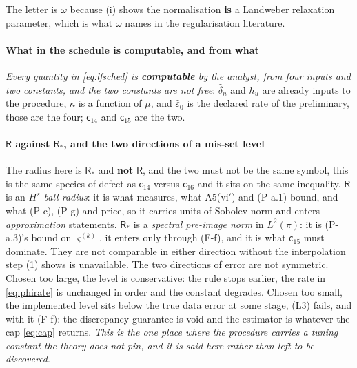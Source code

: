 The letter is $\omega$ because (i) shows the normalisation \textbf{is} a
Landweber relaxation parameter, which is what $\omega$ names in the regularisation literature.

\paragraph{What in the schedule is computable, and from what}

\emph{Every quantity in \eqref{eq:lfsched} is \textbf{computable} by the analyst, from four inputs and
two constants, and the two constants are not free}: $\hat\delta_n$ and $h_u$ are already inputs to the
procedure, $\kappa$ is a function of $\mu$, and $\hat\varepsilon_0$ is the declared rate of the
preliminary, those are the four; $\mathsf c_{14}$ and $\mathsf c_{15}$ are the two.

\paragraph{$\mathsf R$ against $\mathsf R_\ast$, and the two directions of a mis-set level}

The radius here is $\mathsf R_\ast$ and \textbf{not} $\mathsf R$, and the two must not be the same
symbol, this is the same species of defect as $\mathsf c_{14}$ versus $\mathsf c_{16}$ and it sits on
the same inequality. $\mathsf R$ is an \emph{$H^{s}$ ball radius}: it is what 
measures, what A5(vi$'$) and (P-a.1) bound, and what (P-c), (P-g) and  price, so it
carries units of Sobolev norm and enters \emph{approximation} statements. $\mathsf R_\ast$ is a
\emph{spectral pre-image norm} in $L^{2}(\pi)$: it is (P-a.3)'s bound on $\varsigma^{(k)}$, it enters
only through (F-f), and it is what $\mathsf c_{15}$ must dominate. They are not comparable in
either direction without the interpolation step \textup{(1)} shows is unavailable.
The two directions of error are not symmetric. Chosen too large, the level is
conservative: the rule stops earlier, the rate in \eqref{eq:phirate} is unchanged in order and the
constant degrades. Chosen too small, the implemented level sits below the true data error
at some stage, (L3) fails, and with it (F-f): the discrepancy guarantee is void and the estimator is
whatever the cap \eqref{eq:cap} returns. \emph{This is the one place where the procedure carries a tuning constant the
theory does not pin, and it is said here rather than left to be discovered}.

